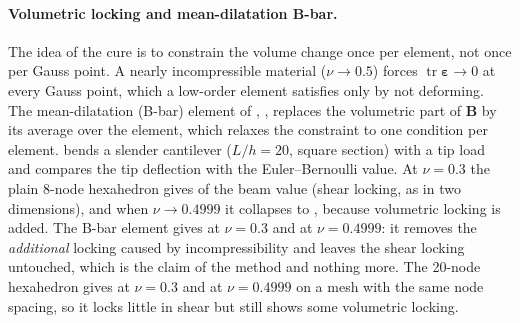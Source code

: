 \paragraph{Volumetric locking and mean-dilatation B-bar.}
The idea of the cure is to constrain the volume change once per element, not once per Gauss point. A nearly incompressible material ($\nu\to0.5$) forces $\operatorname{tr}\bm\varepsilon\to0$ at every Gauss point, which a low-order element satisfies only by not deforming. The mean-dilatation (B-bar) element of \citet{hughes1980bbar}, , replaces the volumetric part of $\bm B$ by its average over the element, which relaxes the constraint to one condition per element.  bends a slender cantilever ($L/h=20$, square section) with a tip load and compares the tip deflection with the Euler--Bernoulli value. At $\nu=0.3$ the plain 8-node hexahedron gives \cecLockHexPlainA{} of the beam value (shear locking, as in two dimensions), and when $\nu\to0.4999$ it collapses to \cecLockHexPlainB{}, because volumetric locking is added. The B-bar element gives \cecLockHexBbarA{} at $\nu=0.3$ and \cecLockHexBbarB{} at $\nu=0.4999$: it removes the \emph{additional} locking caused by incompressibility and leaves the shear locking untouched, which is the claim of the method and nothing more. The 20-node hexahedron gives \cecLockHexTwentyA{} at $\nu=0.3$ and \cecLockHexTwentyB{} at $\nu=0.4999$ on a mesh with the same node spacing, so it locks little in shear but still shows some volumetric locking.

\begin{table}[ht]
\centering\small

\caption{Tip deflection of a slender cantilever divided by the Euler--Bernoulli value, three hexahedra and two Poisson ratios. The 20-node mesh has the node spacing of the 8-node mesh. A 3-D beam does not reach exactly 1 even for a perfect element (root and shear effects), so only the differences between the rows are significant.}\label{tab:el-locking}
\end{table}

